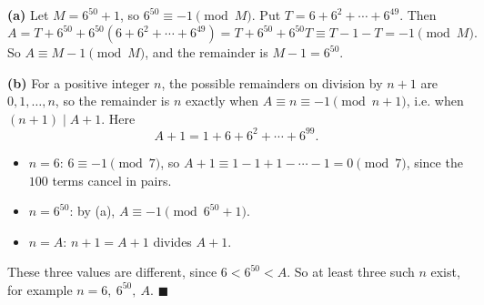 \textbf{(a)} Let $M=6^{50}+1$, so $6^{50}\equiv-1\pmod M$. Put $T=6+6^2+\cdots+6^{49}$. Then
\[A=T+6^{50}+6^{50}\left(6+6^2+\cdots+6^{49}\right)=T+6^{50}+6^{50}T\equiv T-1-T=-1\pmod M.\]
So $A\equiv M-1\pmod M$, and the remainder is $M-1=\boxed{6^{50}}$.

\textbf{(b)} For a positive integer $n$, the possible remainders on division by $n+1$ are $0,1,\dots,n$, so the remainder is $n$ exactly when $A\equiv n\equiv-1\pmod{n+1}$, i.e. when $(n+1)\mid A+1$. Here
\[A+1=1+6+6^2+\cdots+6^{99}.\]
\begin{itemize}
\item $n=6$: $6\equiv-1\pmod7$, so $A+1\equiv1-1+1-\cdots-1=0\pmod7$, since the $100$ terms cancel in pairs.
\item $n=6^{50}$: by (a), $A\equiv-1\pmod{6^{50}+1}$.
\item $n=A$: $n+1=A+1$ divides $A+1$.
\end{itemize}
These three values are different, since $6<6^{50}<A$. So at least three such $n$ exist, for example $\boxed{n=6,\ 6^{50},\ A}$. $\blacksquare$
